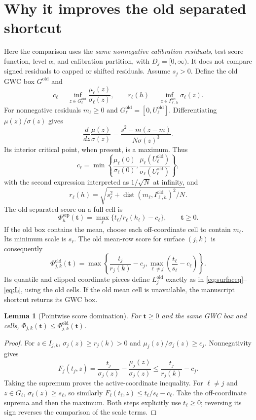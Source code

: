 \documentclass[11pt]{article}
\newtheorem{lemma}[theorem]{Lemma}
\newcommand{\tvec}{\mathbf t}
\begin{document}
\section{Why it improves the old separated shortcut}\label{sec:dominance}
Here the comparison uses the \emph{same nonnegative calibration residuals},
test score function, level $\alpha$, and calibration partition, with $D_j=[0,\infty)$.
It does not compare signed residuals to capped or shifted residuals. Assume
$s_j>0$. Define the old GWC box $G^{\mathrm{old}}$ and
\begin{equation}\label{eq:oldconst}
 c_\ell=\inf_{z\in G^{\mathrm{old}}_\ell}\frac{\mu_\ell(z)}{\sigma_\ell(z)},
 \qquad r_\ell(h)=\inf_{z\in I^{\mathrm{old}}_{\ell,h}}\sigma_\ell(z).
\end{equation}
For nonnegative residuals $m_\ell\ge0$ and
$G^{\mathrm{old}}_\ell=[0,U^{\mathrm{old}}_\ell]$. Differentiating
$\mu(z)/\sigma(z)$ gives
\[
 \frac{d}{dz}\frac{\mu(z)}{\sigma(z)}
 =\frac{s^2-m(z-m)}{N\sigma(z)^3}.
\]
Its interior critical point, when present, is a maximum. Thus
\[
 c_\ell=\min\left\{\frac{\mu_\ell(0)}{\sigma_\ell(0)},
                      \frac{\mu_\ell(U^{\mathrm{old}}_\ell)}
                           {\sigma_\ell(U^{\mathrm{old}}_\ell)}\right\},
\]
with the second expression interpreted as $1/\sqrt N$ at infinity, and
\[
 r_\ell(h)=\sqrt{s_\ell^2+
   \operatorname{dist}(m_\ell,I^{\mathrm{old}}_{\ell,h})^2/N}.
\]
The old separated score on a full cell is
\[
 \Phi_h^{\mathrm{sep}}(\tvec)
 =\max_\ell\{t_\ell/r_\ell(h_\ell)-c_\ell\},\qquad \tvec\ge0.
\]
If the old box contains the mean, choose each off-coordinate cell to contain
$m_\ell$. Its minimum scale is $s_\ell$. The old mean-row score for surface
$(j,k)$ is consequently
\begin{equation}\label{eq:oldrow}
 \Phi^{\mathrm{old}}_{j,k}(\tvec)=
 \max\left\{\frac{t_j}{r_j(k)}-c_j,
             \max_{\ell\ne j}\left(\frac{t_\ell}{s_\ell}-c_\ell\right)\right\}.
\end{equation}
Its quantile and clipped coordinate pieces define $L_j^{\mathrm{old}}$ exactly
as in \eqref{eq:surfaceq}--\eqref{eq:L}, using the old cells. If the old mean
cell is unavailable, the manuscript shortcut returns its GWC box.

\begin{lemma}[Pointwise score domination]\label{lem:domination}
For $\tvec\ge0$ and the same GWC box and cells,
$\overline\Phi_{j,k}(\tvec)\le\Phi^{\mathrm{old}}_{j,k}(\tvec)$.
\end{lemma}
\begin{proof}
For $z\in I_{j,k}$, $\sigma_j(z)\ge r_j(k)>0$ and
$\mu_j(z)/\sigma_j(z)\ge c_j$. Nonnegativity gives
\[
 F_j(t_j,z)=\frac{t_j}{\sigma_j(z)}-\frac{\mu_j(z)}{\sigma_j(z)}
 \le\frac{t_j}{r_j(k)}-c_j.
\]
Taking the supremum proves the active-coordinate inequality. For $\ell\ne j$
and $z\in G_\ell$, $\sigma_\ell(z)\ge s_\ell$, so similarly
$F_\ell(t_\ell,z)\le t_\ell/s_\ell-c_\ell$. Take the off-coordinate suprema
and then the maximum. Both steps explicitly use $t_\ell\ge0$; reversing its
sign reverses the comparison of the scale terms.
\end{proof}
\end{document}

